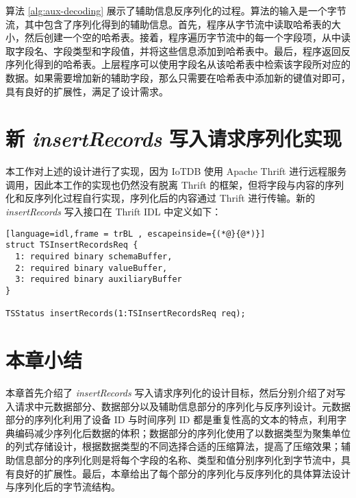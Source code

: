 算法 \ref{alg:aux-decoding} 展示了辅助信息反序列化的过程。算法的输入是一个字节流，其中包含了序列化得到的辅助信息。首先，程序从字节流中读取哈希表的大小，然后创建一个空的哈希表。接着，程序遍历字节流中的每一个字段项，从中读取字段名、字段类型和字段值，并将这些信息添加到哈希表中。最后，程序返回反序列化得到的哈希表。上层程序可以使用字段名从该哈希表中检索该字段所对应的数据。如果需要增加新的辅助字段，那么只需要在哈希表中添加新的键值对即可，具有良好的扩展性，满足了设计需求。

\section{新 \emph{insertRecords} 写入请求序列化实现}
本工作对上述的设计进行了实现，因为 IoTDB 使用 Apache Thrift 进行远程服务调用，因此本工作的实现也仍然没有脱离 Thrift 的框架，但将字段与内容的序列化和反序列化过程自行实现，序列化后的内容通过 Thrift 进行传输。新的 \emph{insertRecords} 写入接口在 Thrift IDL 中定义如下：
\begin{lstlisting}[language=idl,frame = trBL , escapeinside={(*@}{@*)}]
struct TSInsertRecordsReq {
  1: required binary schemaBuffer,
  2: required binary valueBuffer,
  3: required binary auxiliaryBuffer
}
  
TSStatus insertRecords(1:TSInsertRecordsReq req);
\end{lstlisting}

\section{本章小结}
本章首先介绍了 \emph{insertRecords} 写入请求序列化的设计目标，然后分别介绍了对写入请求中元数据部分、数据部分以及辅助信息部分的序列化与反序列设计。元数据部分的序列化利用了设备 ID 与时间序列 ID 都是重复性高的文本的特点，利用字典编码减少序列化后数据的体积；数据部分的序列化使用了以数据类型为聚集单位的列式存储设计，根据数据类型的不同选择合适的压缩算法，提高了压缩效果；辅助信息部分的序列化则是将每个字段的名称、类型和值分别序列化到字节流中，具有良好的扩展性。最后，本章给出了每个部分的序列化与反序列化的具体算法设计与序列化后的字节流结构。